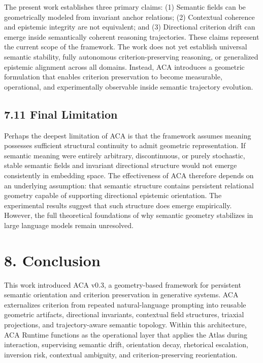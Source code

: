 \documentclass[11pt]{article}
\begin{document}
The present work establishes three primary claims: (1) Semantic fields can be geometrically modeled from invariant anchor relations; (2) Contextual coherence and epistemic integrity are not equivalent; and (3) Directional criterion drift can emerge inside semantically coherent reasoning trajectories. These claims represent the current scope of the framework. The work does not yet establish universal semantic stability, fully autonomous criterion-preserving reasoning, or generalized epistemic alignment across all domains. Instead, ACA introduces a geometric formulation that enables criterion preservation to become measurable, operational, and experimentally observable inside semantic trajectory evolution.

\subsection{7.11 Final Limitation}

Perhaps the deepest limitation of ACA is that the framework assumes meaning possesses sufficient structural continuity to admit geometric representation. If semantic meaning were entirely arbitrary, discontinuous, or purely stochastic, stable semantic fields and invariant directional structure would not emerge consistently in embedding space. The effectiveness of ACA therefore depends on an underlying assumption: that semantic structure contains persistent relational geometry capable of supporting directional epistemic orientation. The experimental results suggest that such structure does emerge empirically. However, the full theoretical foundations of why semantic geometry stabilizes in large language models remain unresolved.

\section{8. Conclusion}

This work introduced ACA v0.3, a geometry-based framework for persistent semantic orientation and criterion preservation in generative systems. ACA externalizes criterion from repeated natural-language prompting into reusable geometric artifacts, directional invariants, contextual field structures, triaxial projections, and trajectory-aware semantic topology. Within this architecture, ACA Runtime functions as the operational layer that applies the Atlas during interaction, supervising semantic drift, orientation decay, rhetorical escalation, inversion risk, contextual ambiguity, and criterion-preserving reorientation.
\end{document}
